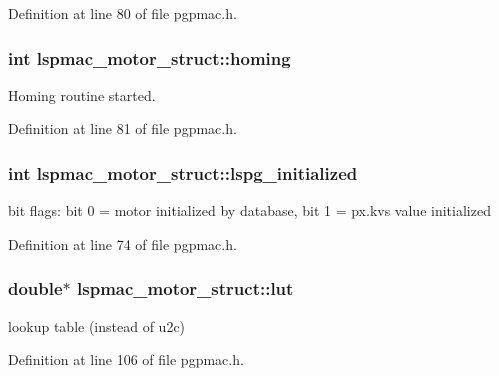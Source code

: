 Definition at line 80 of file pgpmac.\-h.

\hypertarget{structlspmac__motor__struct_aa74108855693f94fc2ff76333c9fb6ac}{
\subsubsection[{homing}]{\setlength{\rightskip}{0pt plus 5cm}int lspmac\-\_\-motor\-\_\-struct\-::homing}}\label{structlspmac__motor__struct_aa74108855693f94fc2ff76333c9fb6ac}


Homing routine started. 



Definition at line 81 of file pgpmac.\-h.

\hypertarget{structlspmac__motor__struct_af11e5f75c1cf88ed6842d04154d27a31}{
\subsubsection[{lspg\-\_\-initialized}]{\setlength{\rightskip}{0pt plus 5cm}int lspmac\-\_\-motor\-\_\-struct\-::lspg\-\_\-initialized}}\label{structlspmac__motor__struct_af11e5f75c1cf88ed6842d04154d27a31}


bit flags\-: bit 0 = motor initialized by database, bit 1 = px.\-kvs value initialized 



Definition at line 74 of file pgpmac.\-h.

\hypertarget{structlspmac__motor__struct_a7b43671f7f3e06521f6cf91fb9ac707d}{
\subsubsection[{lut}]{\setlength{\rightskip}{0pt plus 5cm}double$\ast$ lspmac\-\_\-motor\-\_\-struct\-::lut}}\label{structlspmac__motor__struct_a7b43671f7f3e06521f6cf91fb9ac707d}


lookup table (instead of u2c) 



Definition at line 106 of file pgpmac.\-h.

